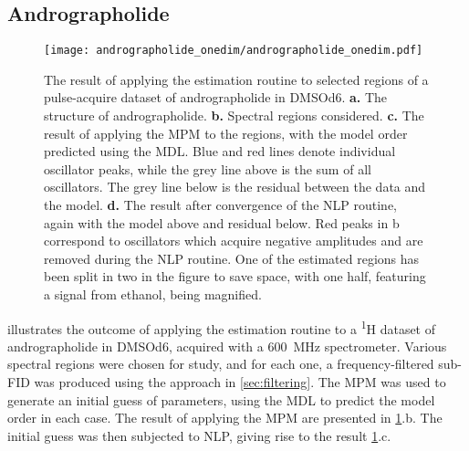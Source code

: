 \subsection{Andrographolide}
\label{subsec:andro}
\begin{figure}
    \centering
    \texttt{[image: andrographolide\_onedim/andrographolide\_onedim.pdf]}
    \caption[
        The result of applying the estimation routine to selected regions of a
        pulse-acquire dataset of andrographolide.
    ]{
        The result of applying the estimation routine to selected regions of a
        pulse-acquire dataset of andrographolide in \acs{DMSOd6}.
        \textbf{a.} The structure of andrographolide.
        \textbf{b.} Spectral regions considered.
        \textbf{c.} The result of applying the \acs{MPM} to the regions, with
        the model order predicted using the \acs{MDL}. Blue and red lines denote
        individual oscillator peaks, while the grey line above is the sum of all
        oscillators. The grey line below is the residual between the data and
        the model.
        \textbf{d.} The result after convergence of the \acs{NLP} routine, again
        with the model above and residual below.
        Red peaks in b correspond to oscillators which acquire negative
        amplitudes and are removed during the \acs{NLP} routine.
        One of the estimated regions has been split in two in the
        figure to save space, with one half, featuring a signal from ethanol,
        being magnified.
    }
    \label{fig:andro-onedim}
\end{figure}
 illustrates the outcome of applying the
estimation routine to a \textsuperscript{1}H dataset of
andrographolide in \acs{DMSOd6}, acquired with
a \qty{600}{\mega\hertz} spectrometer.
Various spectral regions were chosen for study, and for each one, a
frequency-filtered sub-\ac{FID} was produced using the approach in
\cref{sec:filtering}.
The \ac{MPM} was used to generate an initial guess of parameters, using the
\ac{MDL} to predict the model order in each case. The result of applying the
\ac{MPM} are presented in \cref{fig:andro-onedim}.b. The initial guess
was then subjected to \ac{NLP}, giving rise to the result
\cref{fig:andro-onedim}.c.

